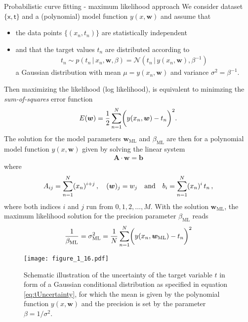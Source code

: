 \documentclass[11pt,DINA4, fleqn]{amsart}
\def\vw{\boldsymbol{w}\xspace}
\def\vb{\boldsymbol{b}\xspace}
\def\mA{\boldsymbol{A}\xspace}
\begin{document}
\begin{mybox_tc3}{Probabilistic curve fitting - maximum likelihood approach}
We consider dataset $\{\boldsymbol{\mathsf{x}}, \boldsymbol{\mathsf{t}}\}$
and a (polynomial) model function $y(x,\bm{w})$ and
assume that
\begin{itemize}
	\item the data points $\{(x_n, t_n)\}$ are statistically independent
	\item and that the target values $t_n$ are distributed according to
	\begin{align}
	t_n  \sim p(t_n \, | \, x_n, \bm{w}, \beta) = \mathcal{N}\left(
	t_n \, \bigl| \, y(x_n,\bm{w}), \beta^{-1}\right) 
	\end{align}
	a Gaussian distribution with mean $\mu = y(x_n, \bm{w})$ and variance $\sigma^2 = \beta^{-1}$.
\end{itemize}
	Then maximizing the likelihood (log likelihood), is equivalent to minimzing the \emph{sum-of-squares} error function
	\begin{align}
	E(\bm{w}) =\dfrac{1}{2} \sum\displaylimits_{n=1}^{N} \biggl(y(x_n, \bm{w}) - t_n\biggl)^2.
	\end{align}
The solution for the model parameters $\bm{w}_{\text{ML}}$ and $\beta_{\text{ML}}$ are then for a polynomial model function $y(x,\bm{w})$ given by
solving the linear system
\begin{align}
\mA \cdot \vw = \vb
\label{eq:linearSystem}
\end{align}
where
\begin{align}
A_{ij} = \sum \displaylimits_{n = 1}^{N} (x_n)^{i + j} \, , \quad
(\vw)_j = w_j \quad \text{and} \quad
b_i = \sum \displaylimits_{n = 1}^{N} (x_n)^{i} \, t_n \, ,
\end{align}
where both indices $i$ and $j$ run from $0, 1, 2, \dotsc, M$.
With the solution $\bm{w}_{\text{ML}}$, the maximum likelihood solution for the precision parameter $\beta_{\text{ML}}$ reads
\begin{align}
\dfrac{1}{\beta_{\text{ML}}} = \sigma^2_{\text{ML}}= \dfrac{1}{N} \sum\displaylimits_{n=1}^{N} \biggl(y(x_n, \bm{w}_{\text{ML}}) - t_n\biggl)^2
\end{align}
\end{mybox_tc3}

\begin{figure}[h]
	\centering
	\texttt{[image: figure\_1\_16.pdf]}
	\caption{Schematic illustration of the uncertainty of the target variable $t$ in form of a Gaussian conditional distribution as specified in equation \eqref{eq:tUncertainty}, for which the mean is given by the polynomial function $y(x,\bm{w})$ and the precision is set by the parameter $\beta = 1/\sigma^2$.
		\label{fig:figure_1_16}}
\end{figure}
\end{document}
